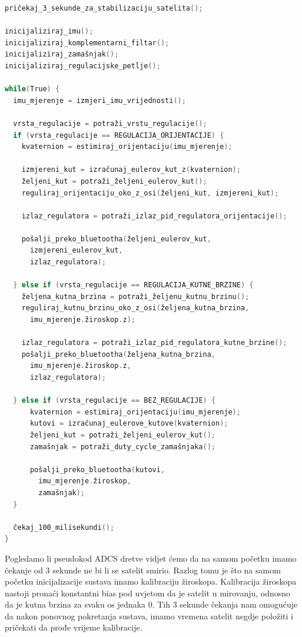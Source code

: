 \documentclass[times, utf8, diplomski, numeric]{templates/template}
\begin{document}
{{{{                \begin{lstlisting}[language=C]
pričekaj_3_sekunde_za_stabilizaciju_satelita();

inicijaliziraj_imu();
inicijaliziraj_komplementarni_filtar();
inicijaliziraj_zamašnjak();
inicijaliziraj_regulacijske_petlje();

while(True) {
  imu_mjerenje = izmjeri_imu_vrijednosti();

  vrsta_regulacije = potraži_vrstu_regulacije();
  if (vrsta_regulacije == REGULACIJA_ORIJENTACIJE) {
    kvaternion = estimiraj_orijentaciju(imu_mjerenje);

    izmjereni_kut = izračunaj_eulerov_kut_z(kvaternion);
    željeni_kut = potraži_željeni_eulerov_kut();
    reguliraj_orijentaciju_oko_z_osi(željeni_kut, izmjereni_kut);

    izlaz_regulatora = potraži_izlaz_pid_regulatora_orijentacije();

    pošalji_preko_bluetootha(željeni_eulerov_kut, 
      izmjereni_eulerov_kut, 
      izlaz_regulatora);

  } else if (vrsta_regulacije == REGULACIJA_KUTNE_BRZINE) {
    željena_kutna_brzina = potraži_željenu_kutnu_brzinu();
    reguliraj_kutnu_brzinu_oko_z_osi(željena_kutna_brzina, 
      imu_mjerenje.žiroskop.z);

    izlaz_regulatora = potraži_izlaz_pid_regulatora_kutne_brzine();
    pošalji_preko_bluetootha(željena_kutna_brzina, 
      imu_mjerenje.žiroskop.z, 
      izlaz_regulatora);

  } else if (vrsta_regulacije == BEZ_REGULACIJE) {
      kvaternion = estimiraj_orijentaciju(imu_mjerenje);
      kutovi = izračunaj_eulerove_kutove(kvaternion);
      željeni_kut = potraži_željeni_eulerov_kut();
      zamašnjak = potraži_duty_cycle_zamašnjaka();

      pošalji_preko_bluetootha(kutovi, 
        imu_mjerenje.žiroskop, 
        zamašnjak);
  }

  čekaj_100_milisekundi();
}               \end{lstlisting}

                Pogledamo li pseudokod ADCS dretve vidjet ćemo da na samom početku imamo čekanje od 3 sekunde ne bi li se satelit smirio. Razlog tomu je što na samom početku inicijalizacije sustava imamo kalibraciju žiroskopa. Kalibracija žiroskopa nastoji pronaći konstantni bias pod uvjetom da je satelit u mirovanju, odnosno da je kutna brzina za svaku os jednaka 0. Tih 3 sekunde čekanja nam omogućuje da nakon ponovnog pokretanja sustava, imamo vremena satelit negdje položiti i pričekati da prođe vrijeme kalibracije.

}}}}
\end{document}
